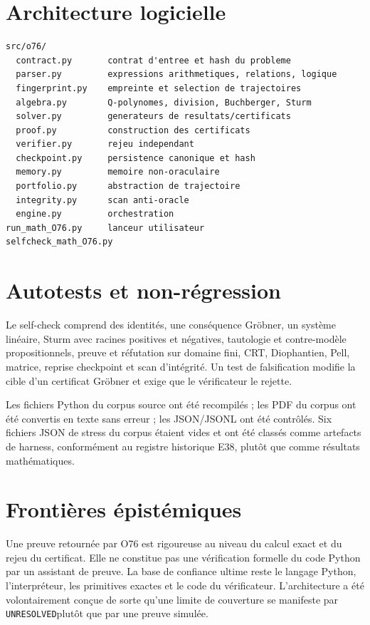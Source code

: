 \documentclass[11pt,a4paper]{article}
\newcommand{\Unr}{\texttt{UNRESOLVED}}
\begin{document}
\section{Architecture logicielle}
\begin{verbatim}
src/o76/
  contract.py       contrat d'entree et hash du probleme
  parser.py         expressions arithmetiques, relations, logique
  fingerprint.py    empreinte et selection de trajectoires
  algebra.py        Q-polynomes, division, Buchberger, Sturm
  solver.py         generateurs de resultats/certificats
  proof.py          construction des certificats
  verifier.py       rejeu independant
  checkpoint.py     persistence canonique et hash
  memory.py         memoire non-oraculaire
  portfolio.py      abstraction de trajectoire
  integrity.py      scan anti-oracle
  engine.py         orchestration
run_math_O76.py     lanceur utilisateur
selfcheck_math_O76.py
\end{verbatim}

\section{Autotests et non-régression}
Le self-check comprend des identités, une conséquence Gröbner, un système linéaire, Sturm avec racines positives et négatives, tautologie et contre-modèle propositionnels, preuve et réfutation sur domaine fini, CRT, Diophantien, Pell, matrice, reprise checkpoint et scan d'intégrité. Un test de falsification modifie la cible d'un certificat Gröbner et exige que le vérificateur le rejette.

Les fichiers Python du corpus source ont été recompilés ; les PDF du corpus ont été convertis en texte sans erreur ; les JSON/JSONL ont été contrôlés. Six fichiers JSON de stress du corpus étaient vides et ont été classés comme artefacts de harness, conformément au registre historique E38, plutôt que comme résultats mathématiques.

\section{Frontières épistémiques}
Une preuve retournée par O76 est rigoureuse au niveau du calcul exact et du rejeu du certificat. Elle ne constitue pas une vérification formelle du code Python par un assistant de preuve. La base de confiance ultime reste le langage Python, l'interpréteur, les primitives exactes et le code du vérificateur. L'architecture a été volontairement conçue de sorte qu'une limite de couverture se manifeste par \Unr plutôt que par une preuve simulée.
\end{document}

